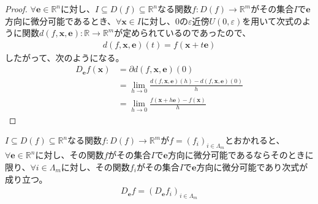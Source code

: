 \documentclass[dvipdfmx]{jsarticle}
\begin{document}
\begin{proof}
$\forall\mathbf{e} \in \mathbb{R}^{n}$に対し、$I \subseteq D(f) \subseteq \mathbb{R}^{n}$なる関数$f:D(f) \rightarrow \mathbb{R}^{m}$がその集合$I$で$\mathbf{e}$方向に微分可能であるとき、$\forall\mathbf{x} \in I$に対し、$0$の$\varepsilon$近傍$U(0,\varepsilon)$を用いて次式のように関数$d\left( f,\mathbf{x},\mathbf{e} \right):\mathbb{R} \rightarrow \mathbb{R}^{m}$が定められているのであったので、
\begin{align*}
d\left( f,\mathbf{x},\mathbf{e} \right)(t) = f\left( \mathbf{x} + t\mathbf{e} \right)
\end{align*}
したがって、次のようになる。
\begin{align*}
D_{\mathbf{e}}f\left( \mathbf{x} \right) &= \partial d\left( f,\mathbf{x},\mathbf{e} \right)(0) \\
&= \lim_{h \rightarrow 0}\frac{d\left( f,\mathbf{x},\mathbf{e} \right)(h) - d\left( f,\mathbf{x},\mathbf{e} \right)(0)}{h} \\
&= \lim_{h \rightarrow 0}\frac{f\left( \mathbf{x} + h\mathbf{e} \right) - f\left( \mathbf{x} \right)}{h}
\end{align*}
\end{proof}
\begin{thm}\label{4.2.3.2}
$I \subseteq D(f) \subseteq \mathbb{R}^{n}$なる関数$f:D(f) \rightarrow \mathbb{R}^{m}$が$f = \left( f_{i} \right)_{i \in \varLambda_{m}}$とおかれると、$\forall\mathbf{e} \in \mathbb{R}^{n}$に対し、その関数$f$がその集合$I$で$\mathbf{e}$方向に微分可能であるならそのときに限り、$\forall i \in \varLambda_{m}$に対し、その関数$f_{i}$がその集合$I$で$\mathbf{e}$方向に微分可能であり次式が成り立つ。
\begin{align*}
D_{\mathbf{e}}f = \left( D_{\mathbf{e}}f_{i} \right)_{i \in \varLambda_{m}}
\end{align*}
\end{thm}
\end{document}
